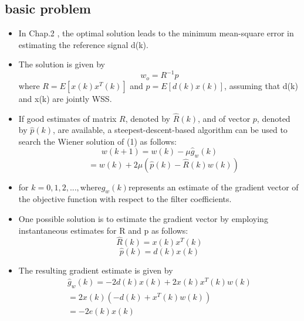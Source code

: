 \documentclass{beamer}
\begin{document}
\subsection{basic problem}

\begin{frame}
    \begin{itemize}
        \item In Chap.2 , the optimal solution leads to the minimum mean-square error in estimating the reference signal d(k).
        \item The solution is given by
             \begin{equation}
            w_{o}=R^{-1}p
            \end{equation}
        where $R = E[x(k)x^{T}(k)]$ and $p = E[d(k)x(k)]$, assuming that d(k) and x(k) are jointly WSS.
        \item If good estimates of matrix $R$, denoted by $\hat{R}(k)$, and of vector $p$, denoted by $\hat{p}(k)$, are available, a steepest-descent-based algorithm can be used to search the Wiener solution of (1) as follows:
            \begin{equation*}
                w(k+1)= w(k) - \mu \hat{g}_{w}(k)
            \end{equation*}
            \begin{equation}
                \quad =w(k) + 2\mu (\hat{p}(k)-\hat{R}(k)w(k)) 
            \end{equation} 
        \item  for $k= 0,1,2,..., $where$\hat{g}_{w}(k) $represents an estimate of the gradient vector of the objective function with respect to the filter coefficients.
    \end{itemize}
\end{frame}

\begin{frame}
    \begin{itemize}
        \item One possible solution is to estimate the gradient vector by employing instantaneous estimates for R and p as follows:
       \begin{equation*}
        \hat{R}(k) = x(k)x^T(k)
       \end{equation*}
       \begin{equation}
        \hat{p}(k) = d(k)x(k)
       \end{equation}
       \item The resulting gradient estimate is given by 
       \begin{multline}
        \hat{g}_{w}(k)=-2d(k)x(k)+2x(k)x^T(k)w(k)\\
        =2x(k)(-d(k)+x^T(k)w(k))\\
        =-2e(k)x(k)\\
       \end{multline}
    \end{itemize}
\end{frame}
\end{document}
